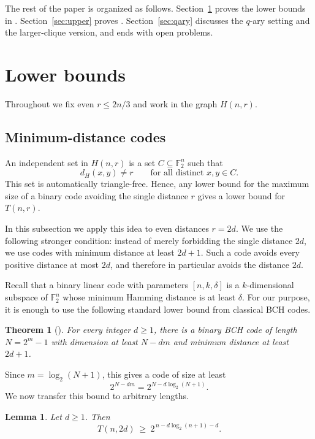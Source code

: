 \documentclass[11pt]{article}
\theoremstyle{plain}
\newtheorem{theorem}{Theorem}
\newtheorem{lemma}{Lemma}
\newcommand{\F}{\mathbb{F}}
\newcommand{\dist}{d_H}
\begin{document}
The rest of the paper is organized as follows.
Section~\ref{sec:lower} proves the lower bounds in .
Section~\ref{sec:upper} proves .
Section~\ref{sec:qary} discusses the $q$-ary setting and the larger-clique
version, and ends with open problems.

\section{Lower bounds}\label{sec:lower}

Throughout we fix even $r\le 2n/3$ and work in the graph $H(n,r)$.

\subsection{Minimum-distance codes}

An independent set in $H(n,r)$ is a set $C\subseteq \F_2^n$ such that
\[
\dist(x,y)\ne r
\qquad\text{for all distinct }x,y\in C.
\]
This set is automatically triangle-free.
Hence, any lower bound for the maximum size of a binary code avoiding the
single distance $r$ gives a lower bound for $T(n,r)$.

In this subsection we apply this idea to even distances $r=2d$.
We use the following stronger condition: instead of merely
forbidding the single distance $2d$, we use codes with minimum
distance at least $2d+1$. Such a code avoids every positive distance at
most $2d$, and therefore in particular avoids the distance $2d$.

Recall that a binary linear code with parameters $[n,k,\delta]$ is a
$k$-dimensional subspace of $\F_2^n$ whose minimum Hamming distance is at
least $\delta$.
For our purpose, it is enough to use the following standard lower bound
from classical BCH codes.

\begin{theorem}[{\cite[Ch.~9, \S1, Theorem~1, p.~258]{MS}}]\label{thm:bch}
For every integer $d\ge 1$, there is a binary BCH code of length
$N=2^m-1$ with dimension at least $N-dm$ and minimum distance at least
$2d+1$.
\end{theorem}

Since $m=\log_2(N+1)$, this gives a code of size at least
\[
2^{N-dm}
=
2^{N-d\log_2(N+1)}.
\]
We now transfer this bound to arbitrary lengths.

\begin{lemma}\label{lem:bch}
Let $d\ge 1$.
Then
\[
T(n,2d)\ \ge\ 2^{\,n-d\log_2(n+1)-d}.
\]
\end{lemma}
\end{document}
